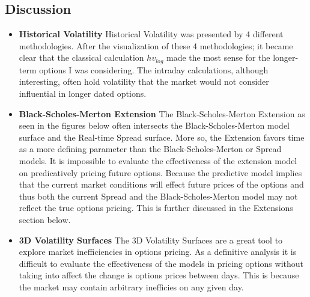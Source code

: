 \documentclass{article}
\begin{document}
\subsection{Discussion}
\begin{flushleft}{
\begin{itemize}
  \item \textbf{Historical Volatility} \newline
  \tabHorizontal Historical Volatility was presented by 4 different methodologies. After the visualization of these 4 methodologies; it became clear that the classical calculation $hv_{log}$ made the most sense for the longer-term options I was considering. The intraday calculations, although interesting, often hold volatility that the market would not consider influential in longer dated options. 
  \item \textbf{Black-Scholes-Merton Extension} \newline
  \tabHorizontal The Black-Scholes-Merton Extension as seen in the figures below often intersects the Black-Scholes-Merton model surface and the Real-time Spread surface. More so, the Extension favors time as a more defining parameter than the Black-Scholes-Merton or Spread models. It is impossible to evaluate the effectiveness of the extension model on predicatively pricing future options. Because the predictive model implies that the current market conditions will effect future prices of the options and thus both the current Spread and the Black-Scholes-Merton model may not reflect the true options pricing. This is further discussed in the Extensions section below. 
  \item \textbf{3D Volatility Surfaces} \newline
  \tabHorizontal The 3D Volatility Surfaces are a great tool to explore market inefficiencies in options pricing. As a definitive analysis it is difficult to evaluate the effectiveness of the models in pricing options without taking into affect the change is options prices between days. This is because the market may contain arbitrary inefficies on any given day. 
\end{itemize}
} 
\end{flushleft}
\end{document}
